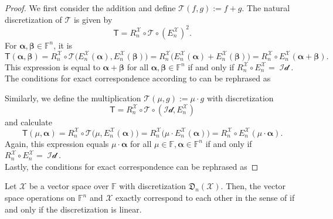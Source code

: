 \documentclass[a4paper]{paper}
\newcommand{\Discr}{\mathfrak{D}}
\newcommand{\VecSpace}[1]{\mathscr{#1}}
\newcommand{\Field}{\mathbb{F}}
\newcommand{\Op}[1]{\mathcal{#1}}
\newcommand{\DiscOp}[1]{\mathsf{#1}}
\newcommand*{\EXT}[2]{\ensuremath{E_{#1}^{#2}}}
\newcommand*{\REST}[2]{\ensuremath{R_{#1}^{#2}}}
\newcommand*{\RnX}{\ensuremath{\REST{n}{\VecSpace{X}}}}
\newcommand*{\EnX}{\ensuremath{\EXT{n}{\VecSpace{X}}}}
\DeclareMathOperator{\Id}{Id}
\newcommand{\valpha}{\boldsymbol{\alpha}}
\newcommand{\vbeta}{\boldsymbol{\beta}}
\begin{document}
\begin{proof}
 We first consider the addition and define $\Op{T}(f,g) := f + g$. The natural discretization of $\Op{T}$ is given by
 \begin{equation*}
  \DiscOp{T} = \RnX \circ \Op{T} \circ (\EnX)^2.
 \end{equation*}
 For $\valpha, \vbeta \in \Field^n$, it is
 \begin{equation*}
  \DiscOp{T}(\valpha, \vbeta) = \RnX \circ \Op{T} \big( \EnX(\valpha), \EnX(\vbeta) \big) 
  = \RnX \big( \EnX(\valpha) + \EnX(\vbeta) \big) = \RnX \circ \EnX(\valpha + \vbeta).
 \end{equation*}
 This expression is equal to $\valpha + \vbeta$ for all $\valpha, \vbeta \in \Field^n$ if and only if $\RnX \circ \EnX = \Op{\Id}$. The 
 conditions for exact correspondence according to  can be rephrased as
 
 
 Similarly, we define the multiplication $\Op{T}(\mu, g) := \mu \cdot g$ with discretization
 \begin{equation*}
  \DiscOp{T} = \RnX \circ \Op{T} \circ (\Op{Id}, \EnX)
 \end{equation*}
 and calculate
 \begin{equation*}
  \DiscOp{T}(\mu, \valpha) = \RnX \circ \Op{T} \big( \mu, \EnX(\valpha) \big) 
  = \RnX \big( \mu \cdot \EnX(\valpha) \big) = \RnX \circ \EnX(\mu \cdot \valpha).
 \end{equation*}
 Again, this expression equals $\mu \cdot \valpha$ for all $\mu \in \Field, \valpha \in \Field^n$ if and only if 
 $\RnX \circ \EnX = \Op{\Id}$.\\
 Lastly, the conditions for exact correspondence can be rephrased as
\end{proof}



\begin{theorem}
 \label{theorem:vector_space_operations}
 Let $\VecSpace{X}$ be a vector space over $\Field$ with discretization $\Discr_{n}(\VecSpace{X})$. Then,
 the vector space operations on $\Field^{n}$ and $\VecSpace{X}$ exactly correspond to each other in the 
 sense of  if and only if the discretization is linear.
\end{theorem}
\end{document}
